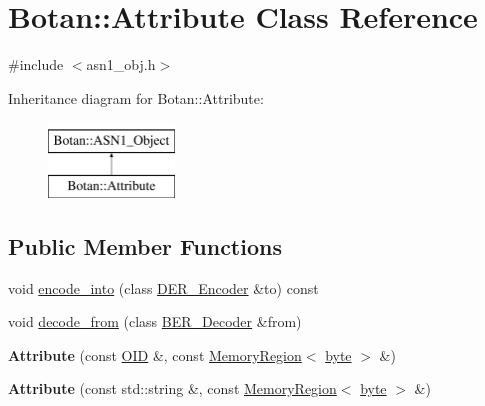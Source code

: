 \hypertarget{classBotan_1_1Attribute}{\section{Botan\-:\-:Attribute Class Reference}
\label{classBotan_1_1Attribute}
}


{\ttfamily \#include $<$asn1\-\_\-obj.\-h$>$}

Inheritance diagram for Botan\-:\-:Attribute\-:\begin{figure}[H]
\begin{center}
\leavevmode
\includegraphics[height=2.000000cm]{classBotan_1_1Attribute}
\end{center}
\end{figure}
\subsection*{Public Member Functions}
\begin{DoxyCompactItemize}
\item 
void \hyperlink{classBotan_1_1Attribute_a186a46b20e753ee3469d6781ea10f4d6}{encode\-\_\-into} (class \hyperlink{classBotan_1_1DER__Encoder}{D\-E\-R\-\_\-\-Encoder} \&to) const 
\item 
void \hyperlink{classBotan_1_1Attribute_a441478a5609e2b323fb3c5d7d7f60b75}{decode\-\_\-from} (class \hyperlink{classBotan_1_1BER__Decoder}{B\-E\-R\-\_\-\-Decoder} \&from)
\item 
\hypertarget{classBotan_1_1Attribute_ad1324ce247e1a44e38e298b16233443f}{{\bfseries Attribute} (const \hyperlink{classBotan_1_1OID}{O\-I\-D} \&, const \hyperlink{classBotan_1_1MemoryRegion}{Memory\-Region}$<$ \hyperlink{namespaceBotan_a7d793989d801281df48c6b19616b8b84}{byte} $>$ \&)}\label{classBotan_1_1Attribute_ad1324ce247e1a44e38e298b16233443f}

\item 
\hypertarget{classBotan_1_1Attribute_a8117dea698735f6275af7e89fce75fd5}{{\bfseries Attribute} (const std\-::string \&, const \hyperlink{classBotan_1_1MemoryRegion}{Memory\-Region}$<$ \hyperlink{namespaceBotan_a7d793989d801281df48c6b19616b8b84}{byte} $>$ \&)}\label{classBotan_1_1Attribute_a8117dea698735f6275af7e89fce75fd5}

\end{DoxyCompactItemize}
